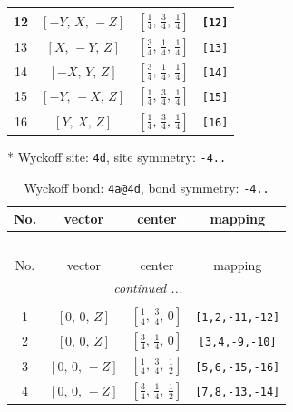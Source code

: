 \documentclass[fleqn,8pt]{jsarticle}
\begin{document}
\begin{longtable}{cccc}
12 & $\left[ - Y,\, X,\, - Z \right]$ & $\left[ \frac{1}{4},\, \frac{3}{4},\, \frac{1}{4} \right]$ & {\tt [12]} \\ \hline
13 & $\left[ X,\, - Y,\, Z \right]$ & $\left[ \frac{3}{4},\, \frac{1}{4},\, \frac{1}{4} \right]$ & {\tt [13]} \\ \hline
14 & $\left[ - X,\, Y,\, Z \right]$ & $\left[ \frac{3}{4},\, \frac{1}{4},\, \frac{1}{4} \right]$ & {\tt [14]} \\ \hline
15 & $\left[ - Y,\, - X,\, Z \right]$ & $\left[ \frac{1}{4},\, \frac{3}{4},\, \frac{1}{4} \right]$ & {\tt [15]} \\ \hline
16 & $\left[ Y,\, X,\, Z \right]$ & $\left[ \frac{1}{4},\, \frac{3}{4},\, \frac{1}{4} \right]$ & {\tt [16]} \\
\end{longtable}
* Wyckoff site: {\tt 4d}, site symmetry: {\tt -4..}
\renewcommand{\arraystretch}{1.2}
\begin{longtable}{cccc}
\caption{Wyckoff bond: {\tt 4a@4d}, bond symmetry: {\tt -4..}}
 \\
 \hline \hline
No. & vector & center & mapping \\ \hline \endfirsthead

\multicolumn{3}{l}{\tablename\ \thetable{}} \\
 \hline \hline
No. & vector & center & mapping \\ \hline \endhead

 \hline \hline
\multicolumn{3}{r}{\footnotesize\it continued ...} \\ \endfoot

 \hline \hline
\multicolumn{3}{r}{} \\ \endlastfoot

1 & $\left[ 0,\, 0,\, Z \right]$ & $\left[ \frac{1}{4},\, \frac{3}{4},\, 0 \right]$ & {\tt [1,2,-11,-12]} \\ \hline
2 & $\left[ 0,\, 0,\, Z \right]$ & $\left[ \frac{3}{4},\, \frac{1}{4},\, 0 \right]$ & {\tt [3,4,-9,-10]} \\ \hline
3 & $\left[ 0,\, 0,\, - Z \right]$ & $\left[ \frac{1}{4},\, \frac{3}{4},\, \frac{1}{2} \right]$ & {\tt [5,6,-15,-16]} \\ \hline
4 & $\left[ 0,\, 0,\, - Z \right]$ & $\left[ \frac{3}{4},\, \frac{1}{4},\, \frac{1}{2} \right]$ & {\tt [7,8,-13,-14]} \\
\end{longtable}
\renewcommand{\arraystretch}{1.2}
\end{document}
